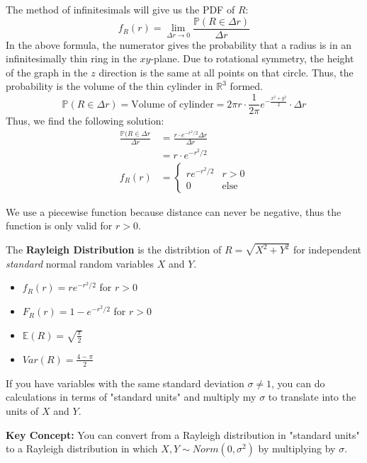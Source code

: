 \documentclass[titlepage, 12pt, leqno]{article}
\begin{document}
The method of infinitesimals will give us the PDF of $R$:
\[
    f_R(r) = \lim_{\Delta r \to 0} \frac{\mathbb{P}(R \in \Delta r)}{\Delta r}
\]
In the above formula, the numerator gives the probability that a radius is in an
infinitesimally thin ring in the $xy$-plane. Due to rotational symmetry, the height of
the graph in the $z$ direction is the same at all points on that circle. Thus, the 
probability is the volume of the thin cylinder in $\mathbb{R}^3$ formed.
\[
    \mathbb{P}(R \in \Delta r) = \text{Volume of cylinder} = 
    2\pi r \cdot \frac{1}{2\pi } e^{-\frac{x^2+y^2}{2}} \cdot \Delta r
\]
Thus, we find the following solution:
\begin{align*}
    \frac{\mathbb{P}(R \in \Delta r}{\Delta r} &= \frac{r \cdot e^{-r^2/2}\Delta r}
        {\Delta r} \\
                                               &= r \cdot e^{-r^2/2} \\
        f_R(r) &= 
            \begin{cases}
                re^{-r^2/2} & r>0 \\
                0 & \text{else}
            \end{cases}
\end{align*}

\begin{note}
    We use a piecewise function because distance can never be negative, thus the function
    is only valid for $r>0$.
\end{note}

\begin{definition}
    The \textbf{Rayleigh Distribution} is the distribtion of $R = \sqrt{X^2+Y^2}$ for
    independent \textit{standard} normal random variables $X$ and $Y$.
    \begin{itemize}
        \item $f_R(r) = re^{-r^2/2}$ for $r > 0$
        \item $F_R(r) = 1 - e^{-r^2/2}$ for $r > 0$
        \item $ \mathbb{E}(R) = \sqrt{\frac{\pi }{2}}$
        \item $Var(R) = \frac{4-\pi }{2}$
    \end{itemize}
    If you have variables with the same standard deviation $\sigma \ne 1$, you can do
    calculations in terms of "standard units" and multiply my $\sigma$ to translate 
    into the units of $X$ and $Y$.
\end{definition}

\pagebreak
\textbf{Key Concept:} You can convert from a Rayleigh distribution in "standard units" to
a Rayleigh distribution in which $X,Y \sim Norm(0,\sigma^2)$ by multiplying by $\sigma$.
\end{document}

